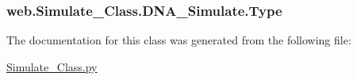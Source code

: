 \hypertarget{classweb_1_1_simulate___class_1_1_d_n_a___simulate_aa234468d2d8f7d04de55e93cb1ab0680}{
\subsubsection[{Type}]{\setlength{\rightskip}{0pt plus 5cm}web.\-Simulate\-\_\-\-Class.\-D\-N\-A\-\_\-\-Simulate.\-Type}}\label{classweb_1_1_simulate___class_1_1_d_n_a___simulate_aa234468d2d8f7d04de55e93cb1ab0680}


The documentation for this class was generated from the following file\-:\begin{DoxyCompactItemize}
\item 
\hyperlink{_simulate___class_8py}{Simulate\-\_\-\-Class.\-py}\end{DoxyCompactItemize}
